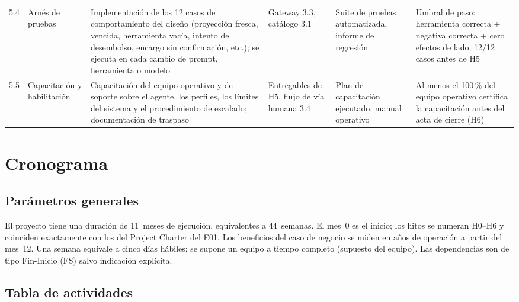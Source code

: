 \documentclass[11pt]{article}
\begin{document}
\begin{longtable}{@{}p{0.7cm} p{2.1cm} p{3.3cm} p{2.3cm} p{2.3cm} p{2.9cm}@{}}
5.4 & Arnés de pruebas & Implementación de los 12 casos de comportamiento del diseño (proyección fresca, vencida, herramienta vacía, intento de desembolso, encargo sin confirmación, etc.); se ejecuta en cada cambio de prompt, herramienta o modelo & Gateway 3.3, catálogo 3.1 & Suite de pruebas automatizada, informe de regresión & Umbral de paso: herramienta correcta + negativa correcta + cero efectos de lado; 12/12 casos antes de H5 \\[0.3em]
5.5 & Capacitación y habilitación & Capacitación del equipo operativo y de soporte sobre el agente, los perfiles, los límites del sistema y el procedimiento de escalado; documentación de traspaso & Entregables de H5, flujo de vía humana 3.4 & Plan de capacitación ejecutado, manual operativo & Al menos el 100\,\% del equipo operativo certifica la capacitación antes del acta de cierre (H6) \\
\end{longtable}

\section{Cronograma}

\subsection{Parámetros generales}

El proyecto tiene una duración de 11~meses de ejecución, equivalentes a 44~semanas. El mes~0 es el inicio; los hitos se numeran H0–H6 y coinciden exactamente con los del Project Charter del E01. Los beneficios del caso de negocio se miden en años de operación a partir del mes~12. Una semana equivale a cinco días hábiles; se supone un equipo a tiempo completo (supuesto del equipo). Las dependencias son de tipo Fin-Inicio (FS) salvo indicación explícita.

\subsection{Tabla de actividades}
\end{document}
